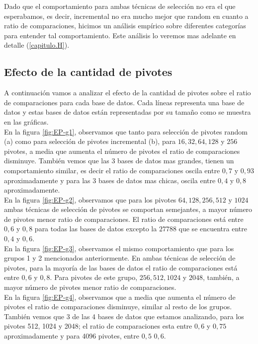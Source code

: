 Dado que el comportamiento para ambas t\'ecnicas de selecci\'on no era el que esperabamos, es decir, incremental no era mucho mejor que random en cuanto a ratio de comparaciones, hicimos un an\'alisis emp\'irico sobre diferentes categor\'ias para entender tal comportamiento. Este an\'alisis lo veremos mas adelante en detalle (\ref{capitulo.H}).

\subsection{Efecto de la cantidad de pivotes}

A continuaci\'on vamos a analizar el efecto de la cantidad de pivotes sobre el ratio de comparaciones para cada base de datos. Cada l\'ineas representa una base de datos y estas bases de datos est\'an representadas por su tamaño como se muestra en las gr\'aficas.\\

En la figura \ref{fig:EP-g1}, observamos que tanto para selecci\'on de pivotes random (a) como para selecci\'on de pivotes incremental (b), para $16, 32, 64, 128$ y $256$ pivotes, a media que aumenta el n\'umero de pivotes el ratio de comparaciones disminuye. Tambi\'en vemos que las 3 bases de datos mas grandes, tienen un comportamiento similar, es decir el ratio de comparaciones oscila entre $0,7$ y $0,93$ aproximadamente y para las 3 bases de datos mas chicas, oscila entre $0,4$ y $0,8$ aproximadamente.\\

En la figura \ref{fig:EP-g2}, observamos que para los pivotes $64, 128, 256, 512$ y $1024$ ambas t\'ecnicas de selecci\'on de pivotes se comportan semejantes, a mayor n\'umero de pivotes menor ratio de comparaciones. El ratio de comparaciones est\'a entre $0,6$ y $0,8$ para todas las bases de datos excepto la $27788$ que se encuentra entre $0,4$ y $0,6$.\\

En la figura \ref{fig:EP-g3}, observamos el mismo comportamiento que para los grupos 1 y 2 mencionados anteriormente. En ambas t\'ecnicas de selecci\'on de pivotes, para la mayor\'ia de las bases de datos el ratio de comparaciones est\'a entre $0,6$ y $0,8$. Para pivotes de este grupo, $256, 512, 1024$ y $2048$, tambi\'en, a mayor n\'umero de pivotes menor ratio de comparaciones.\\

En la figura \ref{fig:EP-g4}, observamos que a media que aumenta el n\'umero de pivotes el ratio de comparaciones disminuye, similar al resto de los grupos. Tambi\'en vemos que 3 de las 4 bases de datos que estamos analizando, para los pivotes 512, 1024 y 2048; el ratio de comparaciones esta entre $0,6$ y $0,75$ aproximadamente y para 4096 pivotes, entre $0,5$ $0,6$.\\

